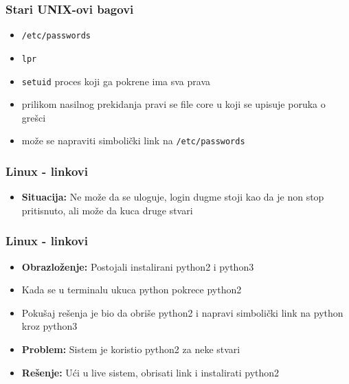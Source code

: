 \documentclass{beamer}
\begin{document}
\begin{frame}
    \frametitle{Stari UNIX-ovi bagovi}
    \begin{itemize}
        \item \lstinline|/etc/passwords| \newline
        \item \lstinline|lpr| \newline
        \item \lstinline|setuid| proces koji ga pokrene ima sva prava \newline
        \item prilikom nasilnog prekidanja pravi se file core u koji se upisuje poruka o grešci \newline
        \item može se napraviti simbolički link na \lstinline|/etc/passwords|
    \end{itemize}
\end{frame}

\begin{frame}
    \frametitle{Linux - linkovi}
    \begin{itemize}
        \item \textbf{Situacija:} Ne može da se uloguje, login dugme stoji kao da je non stop pritisnuto, ali može da kuca druge stvari \newline
    \end{itemize}
\end{frame}

\begin{frame}
    \frametitle{Linux - linkovi}
    \begin{itemize}
        \item \textbf{Obrazloženje:} Postojali instalirani python2 i python3 \newline
        \item Kada se u terminalu ukuca python pokrece python2 \newline
        \item Pokušaj rešenja je bio da obriše python2 i napravi simbolički link na python kroz python3 \newline
        \item \textbf{Problem:} Sistem je koristio python2 za neke stvari \newline
        \item \textbf{Rešenje:} Ući u live sistem, obrisati link i instalirati python2 \newline
    \end{itemize}
\end{frame}
\end{document}
